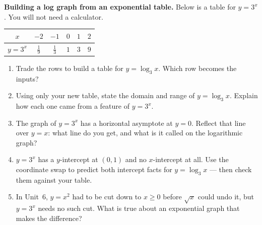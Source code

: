 \documentclass[10pt]{article}
\begin{document}
\begin{extensionbox}
\textbf{Building a log graph from an exponential table.} Below is a table for $y=3^x$. You will not
need a calculator.
\begin{center}
\renewcommand{\arraystretch}{1.25}
\begin{tabular}{|c|c|c|c|c|c|}
\hline
$x$ & $-2$ & $-1$ & $0$ & $1$ & $2$ \\ \hline
$y=3^x$ & $\tfrac19$ & $\tfrac13$ & $1$ & $3$ & $9$ \\ \hline
\end{tabular}
\end{center}
\begin{enumerate}[label=(\alph*), leftmargin=1.8em, itemsep=5pt]
  \item Trade the rows to build a table for $y=\log_3 x$. Which row becomes the inputs?
  \item Using only your new table, state the domain and range of $y=\log_3 x$. Explain how each one
        came from a feature of $y=3^x$.
  \item The graph of $y=3^x$ has a horizontal asymptote at $y=0$. Reflect that line over $y=x$: what
        line do you get, and what is it called on the logarithmic graph?
  \item $y=3^x$ has a $y$-intercept at $(0,1)$ and no $x$-intercept at all. Use the coordinate swap
        to predict both intercept facts for $y=\log_3 x$ --- then check them against your table.
  \item In Unit~6, $y=x^2$ had to be cut down to $x\ge 0$ before $\sqrt{x}$ could undo it, but
        $y=3^x$ needs no such cut. What is true about an exponential graph that makes the difference?
\end{enumerate}
\end{extensionbox}
\end{document}
